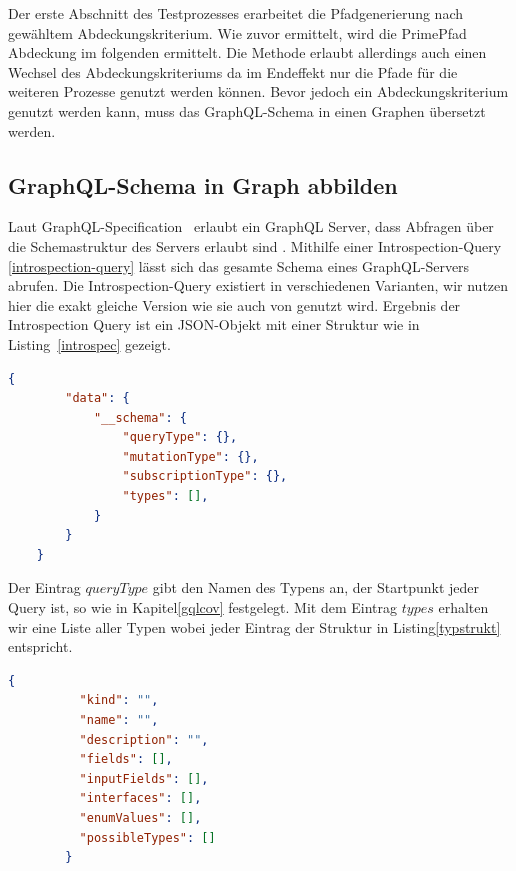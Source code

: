 Der erste Abschnitt des Testprozesses erarbeitet die Pfadgenerierung nach gewähltem Abdeckungskriterium.
Wie zuvor ermittelt, wird die PrimePfad Abdeckung im folgenden ermittelt.
Die Methode erlaubt allerdings auch einen Wechsel des Abdeckungskriteriums da im Endeffekt nur die Pfade für die weiteren Prozesse
genutzt werden können.
Bevor jedoch ein Abdeckungskriterium genutzt werden kann, muss das GraphQL-Schema in einen Graphen übersetzt werden.

\subsection{GraphQL-Schema in Graph abbilden}
\label{schemagraph}

Laut GraphQL-Specification~\cite{graphqlspecification} erlaubt ein GraphQL Server, dass Abfragen über die Schemastruktur des
Servers erlaubt sind \cite[vgl. 4. Introspection]{graphqlspecification}.
Mithilfe einer Introspection-Query \ref{introspection-query} lässt sich das gesamte Schema eines GraphQL-Servers abrufen.
Die Introspection-Query existiert in verschiedenen Varianten, wir nutzen hier die exakt gleiche Version wie sie auch von \cite{property-based-testing} genutzt wird.
Ergebnis der Introspection Query ist ein JSON-Objekt mit einer Struktur wie in Listing~\ref{introspec} gezeigt.

\begin{lstlisting}[language=json, caption={Schema-Response},captionpos=b]
    {
        "data": {
            "__schema": {
                "queryType": {},
                "mutationType": {},
                "subscriptionType": {},
                "types": [],
            }
        }
    }
\end{lstlisting}
\label{introspec}

Der Eintrag $queryType$ gibt den Namen des Typens an, der Startpunkt jeder Query ist, so wie in Kapitel\ref{gqlcov} festgelegt.
Mit dem Eintrag $types$ erhalten wir eine Liste aller Typen wobei jeder Eintrag der Struktur in Listing\ref{typstrukt} entspricht.

\begin{lstlisting}[language=json, caption={Type-Field},captionpos=b]
        {
          "kind": "",
          "name": "",
          "description": "",
          "fields": [],
          "inputFields": [],
          "interfaces": [],
          "enumValues": [],
          "possibleTypes": []
        }
\end{lstlisting}
\label{typstrukt}


